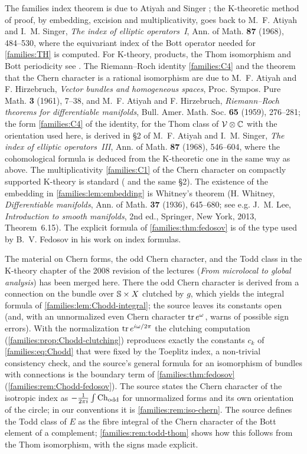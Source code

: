 The families index theorem is due to Atiyah and Singer
\cite{Atiyah-Singer-IV}; the K-theoretic method of proof, by embedding,
excision and multiplicativity, goes back to M.~F. Atiyah and I.~M. Singer,
\emph{The index of elliptic operators~I}, Ann. of Math. \textbf{87} (1968),
484--530, where the equivariant index of the Bott operator needed for
\ref{families:TH} is computed. For K-theory, products, the Thom isomorphism
and Bott periodicity see \cite{Atiyah-K}. The Riemann--Roch identity
\ref{families:C4} and the theorem that the Chern character is a rational
isomorphism are due to M.~F. Atiyah and F. Hirzebruch, \emph{Vector bundles
and homogeneous spaces}, Proc. Sympos. Pure Math. \textbf{3} (1961), 7--38,
and M.~F. Atiyah and F. Hirzebruch, \emph{Riemann--Roch theorems for
differentiable manifolds}, Bull. Amer. Math. Soc. \textbf{65} (1959),
276--281; the form \ref{families:C4} of the identity, for the Thom class of
$\mathcal V\otimes\mathbb{C}$ with the orientation used here, is derived in \S2 of
M.~F. Atiyah and I.~M. Singer, \emph{The index of elliptic operators~III},
Ann. of Math. \textbf{87} (1968), 546--604, where the cohomological formula is
deduced from the K-theoretic one in the same way as above. The
multiplicativity \ref{families:C1} of the Chern character on compactly
supported K-theory is standard (\cite{Atiyah-K} and the same \S2). The
existence of the embedding in \cref{families:lem:embedding} is Whitney's
theorem (H. Whitney, \emph{Differentiable manifolds}, Ann. of Math.
\textbf{37} (1936), 645--680; see e.g. J.~M. Lee, \emph{Introduction to smooth
manifolds}, 2nd ed., Springer, New York, 2013, Theorem~6.15).
The explicit formula of \cref{families:thm:fedosov} is of the type used by
B.~V. Fedosov in his work on index formulas.

The material on Chern forms, the odd Chern character, and the Todd class in the K-theory
chapter of the 2008 revision of the lectures (\emph{From microlocal to global analysis})
has been merged here. There the odd Chern character is derived from a connection on the
bundle over $\mathbb{S}\times X$ clutched by $g$, which yields the integral formula of
\cref{families:lem:Chodd-integral}; the source leaves its constants open (and, with an
unnormalized even Chern character $\operatorname{tr} e^{\omega}$, warns of possible sign errors). With the
normalization $\operatorname{tr} e^{i\omega/2\pi}$ the clutching computation
(\cref{families:prop:Chodd-clutching}) reproduces exactly the constants $c_k$ of
\eqref{families:eq:Chodd} that were fixed by the Toeplitz index, a non-trivial consistency
check, and the source's general formula for an isomorphism of bundles with connections is the
boundary term of \cref{families:thm:fedosov} (\cref{families:rem:Chodd-fedosov}). The source
states the Chern character of the isotropic index as $-\frac1{2\pi i}\int\operatorname{Ch}_{\mathrm{odd}}$ for
unnormalized forms and its own orientation of the circle; in our conventions it is
\cref{families:rem:iso-chern}. The source defines the Todd class of $E$ as the fibre integral
of the Chern character of the Bott element of a complement; \cref{families:rem:todd-thom}
shows how this follows from the Thom isomorphism, with the signs made explicit.
